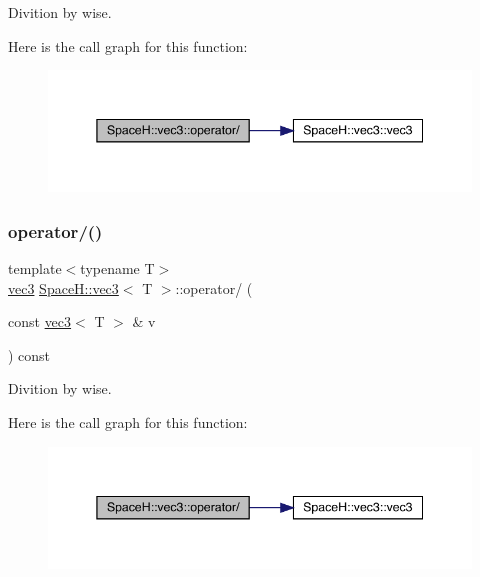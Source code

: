 Divition by wise. 

Here is the call graph for this function\+:
\nopagebreak
\begin{figure}[H]
\begin{center}
\leavevmode
\includegraphics[width=345pt]{struct_space_h_1_1vec3_ab9d46a10bb578ff6939ed9280cb12df8_cgraph}
\end{center}
\end{figure}
\mbox{\label{struct_space_h_1_1vec3_ab9d46a10bb578ff6939ed9280cb12df8}} 
\subsubsection{\texorpdfstring{operator/()}{operator/()}\hspace{0.1cm}{\footnotesize\ttfamily [2/7]}}
{\footnotesize\ttfamily template$<$typename T$>$ \\
\mbox{\hyperlink{struct_space_h_1_1vec3}{vec3}} \mbox{\hyperlink{struct_space_h_1_1vec3}{Space\+H\+::vec3}}$<$ T $>$\+::operator/ (\begin{DoxyParamCaption}\item[{const \mbox{\hyperlink{struct_space_h_1_1vec3}{vec3}}$<$ T $>$ \&}]{v }\end{DoxyParamCaption}) const\hspace{0.3cm}{\ttfamily [inline]}}



Divition by wise. 

Here is the call graph for this function\+:
\nopagebreak
\begin{figure}[H]
\begin{center}
\leavevmode
\includegraphics[width=345pt]{struct_space_h_1_1vec3_ab9d46a10bb578ff6939ed9280cb12df8_cgraph}
\end{center}
\end{figure}
\mbox{\label{struct_space_h_1_1vec3_ab9d46a10bb578ff6939ed9280cb12df8}} 
